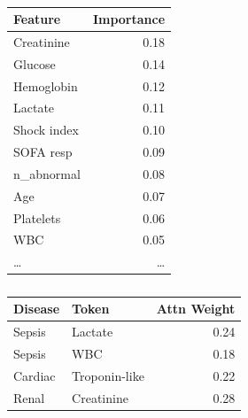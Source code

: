\begin{table}[h]
\begin{englishblock}
\centering
\caption{}
\begin{tabular}{lr}
\toprule
Feature & Importance \\
\midrule
Creatinine & 0.18 \\
Glucose & 0.14 \\
Hemoglobin & 0.12 \\
Lactate & 0.11 \\
Shock index & 0.10 \\
SOFA resp & 0.09 \\
n\_abnormal & 0.08 \\
Age & 0.07 \\
Platelets & 0.06 \\
WBC & 0.05 \\
\ldots & \ldots \\
\bottomrule
\end{tabular}
\label{tab:shap_top20}
\end{englishblock}
\end{table}

\begin{table}[h]
\begin{englishblock}
\centering
\caption{}
\begin{tabular}{llr}
\toprule
Disease & Token & Attn Weight \\
\midrule
Sepsis & Lactate & 0.24 \\
Sepsis & WBC & 0.18 \\
Cardiac & Troponin-like & 0.22 \\
Renal & Creatinine & 0.28 \\
\bottomrule
\end{tabular}
\label{tab:attention_tokens}
\end{englishblock}
\end{table}

